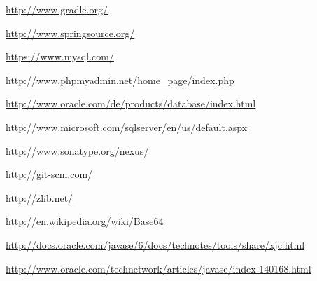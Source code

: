 \documentclass[paper=a4,twoside=false,BCOR=0mm,DIV=calc,fontsize=12pt]{scrartcl}
\begin{document}
\begin{thebibliography}{99}
 \url{http://www.gradle.org/}

 \url{http://www.springsource.org/}

 \url{https://www.mysql.com/}

 \url{http://www.phpmyadmin.net/home_page/index.php}

 \url{http://www.oracle.com/de/products/database/index.html}

 \url{http://www.microsoft.com/sqlserver/en/us/default.aspx}

 \url{http://www.sonatype.org/nexus/}

 \url{}

 \url{}

 \url{}

 \url{http://git-scm.com/}

 \url{http://zlib.net/}

 \url{http://en.wikipedia.org/wiki/Base64}

 \url{http://docs.oracle.com/javase/6/docs/technotes/tools/share/xjc.html}

 \url{http://www.oracle.com/technetwork/articles/javase/index-140168.html}

\end{thebibliography}
\end{document}
